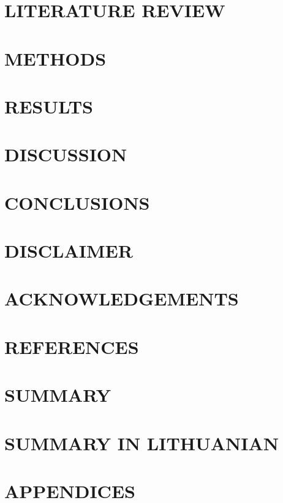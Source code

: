 \documentclass[11pt]{report}
\begin{document}
\chapter{LITERATURE REVIEW}


\chapter{METHODS}


\chapter{RESULTS}


\chapter{DISCUSSION}


\chapter{CONCLUSIONS}


%

\chapter{DISCLAIMER}


\chapter{ACKNOWLEDGEMENTS}


\chapter{REFERENCES}
\printbibliography[heading=none]

\chapter{SUMMARY}


\chapter{SUMMARY IN LITHUANIAN}


\chapter{APPENDICES}

\end{document}
